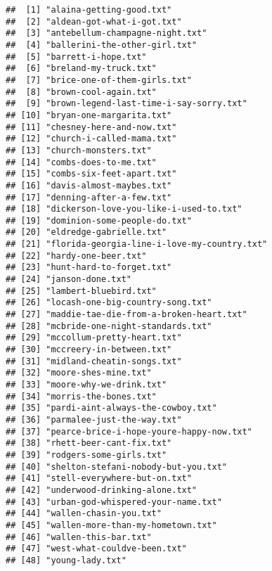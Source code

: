 \documentclass[]{article}
\begin{document}
\begin{verbatim}
##  [1] "alaina-getting-good.txt"                   
##  [2] "aldean-got-what-i-got.txt"                 
##  [3] "antebellum-champagne-night.txt"            
##  [4] "ballerini-the-other-girl.txt"              
##  [5] "barrett-i-hope.txt"                        
##  [6] "breland-my-truck.txt"                      
##  [7] "brice-one-of-them-girls.txt"               
##  [8] "brown-cool-again.txt"                      
##  [9] "brown-legend-last-time-i-say-sorry.txt"    
## [10] "bryan-one-margarita.txt"                   
## [11] "chesney-here-and-now.txt"                  
## [12] "church-i-called-mama.txt"                  
## [13] "church-monsters.txt"                       
## [14] "combs-does-to-me.txt"                      
## [15] "combs-six-feet-apart.txt"                  
## [16] "davis-almost-maybes.txt"                   
## [17] "denning-after-a-few.txt"                   
## [18] "dickerson-love-you-like-i-used-to.txt"     
## [19] "dominion-some-people-do.txt"               
## [20] "eldredge-gabrielle.txt"                    
## [21] "florida-georgia-line-i-love-my-country.txt"
## [22] "hardy-one-beer.txt"                        
## [23] "hunt-hard-to-forget.txt"                   
## [24] "janson-done.txt"                           
## [25] "lambert-bluebird.txt"                      
## [26] "locash-one-big-country-song.txt"           
## [27] "maddie-tae-die-from-a-broken-heart.txt"    
## [28] "mcbride-one-night-standards.txt"           
## [29] "mccollum-pretty-heart.txt"                 
## [30] "mccreery-in-between.txt"                   
## [31] "midland-cheatin-songs.txt"                 
## [32] "moore-shes-mine.txt"                       
## [33] "moore-why-we-drink.txt"                    
## [34] "morris-the-bones.txt"                      
## [35] "pardi-aint-always-the-cowboy.txt"          
## [36] "parmalee-just-the-way.txt"                 
## [37] "pearce-brice-i-hope-youre-happy-now.txt"   
## [38] "rhett-beer-cant-fix.txt"                   
## [39] "rodgers-some-girls.txt"                    
## [40] "shelton-stefani-nobody-but-you.txt"        
## [41] "stell-everywhere-but-on.txt"               
## [42] "underwood-drinking-alone.txt"              
## [43] "urban-god-whispered-your-name.txt"         
## [44] "wallen-chasin-you.txt"                     
## [45] "wallen-more-than-my-hometown.txt"          
## [46] "wallen-this-bar.txt"                       
## [47] "west-what-couldve-been.txt"                
## [48] "young-lady.txt"
\end{verbatim}
\end{document}
